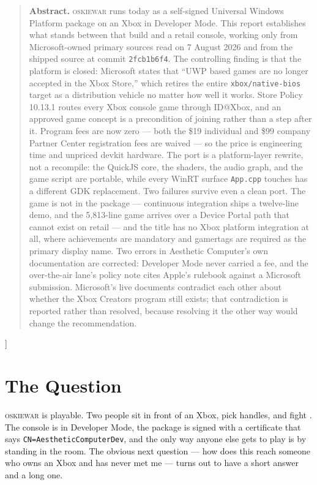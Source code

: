 \documentclass[10pt,letterpaper,twocolumn]{article}
\newcommand{\game}{\textsc{oskiewar}}
\newcommand{\code}[1]{\texttt{#1}}
\begin{document}
{\begin{quote}
\small\noindent\textbf{Abstract.}
\game{} runs today as a self-signed Universal Windows Platform package on an Xbox in Developer Mode. This report establishes what stands between that build and a retail console, working only from Microsoft-owned primary sources read on 7 August 2026 and from the shipped source at commit \code{2fcb1b6f4}. The controlling finding is that the platform is closed: Microsoft states that ``UWP based games are no longer accepted in the Xbox Store,'' which retires the entire \code{xbox/native-bios} target as a distribution vehicle no matter how well it works. Store Policy 10.13.1 routes every Xbox console game through ID@Xbox, and an approved game concept is a precondition of joining rather than a step after it. Program fees are now zero --- both the \$19 individual and \$99 company Partner Center registration fees are waived --- so the price is engineering time and unpriced devkit hardware. The port is a platform-layer rewrite, not a recompile: the QuickJS core, the shaders, the audio graph, and the game script are portable, while every WinRT surface \code{App.cpp} touches has a different GDK replacement. Two failures survive even a clean port. The game is not in the package --- continuous integration ships a twelve-line demo, and the 5,813-line game arrives over a Device Portal path that cannot exist on retail --- and the title has no Xbox platform integration at all, where achievements are mandatory and gamertags are required as the primary display name. Two errors in Aesthetic Computer's own documentation are corrected: Developer Mode never carried a fee, and the over-the-air lane's policy note cites Apple's rulebook against a Microsoft submission. Microsoft's live documents contradict each other about whether the Xbox Creators program still exists; that contradiction is reported rather than resolved, because resolving it the other way would change the recommendation.
\end{quote}
\vspace{0.4em}
}]

\section{The Question}

\game{} is playable. Two people sit in front of an Xbox, pick handles, and fight \cite{scudder2026oskiewar}. The console is in Developer Mode, the package is signed with a certificate that says \code{CN=AestheticComputerDev}, and the only way anyone else gets to play is by standing in the room. The obvious next question --- how does this reach someone who owns an Xbox and has never met me --- turns out to have a short answer and a long one.
\end{document}
